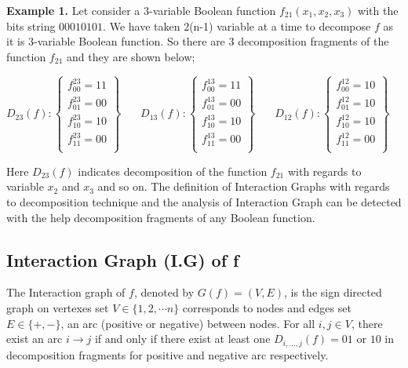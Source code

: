 \documentclass{article}
\begin{document}
 \textbf{Example 1.} Let consider a $3$-variable Boolean function $f_{21}(x_{1},x_{2},x_{3})$ with the bits string $00010101$. We have taken 2(n-1) variable at a time to decompose $f$ as it is 3-variable Boolean function. So there are $3$ decomposition fragments of the function  $f_{21}$ and they are shown below; 
 \begin{center}
   \resizebox{10cm}{!}
   {
   \centering
     $D_{23}(f) :\left \lbrace \begin{array}{c}
     
          f_{00}^{23}=11\\
          f_{01}^{23}=00\\
          f_{10}^{23}=10\\
          f_{11}^{23}=00\\
                           			
     \end{array} \right\rbrace$ $\:\:\:\:\:$
     $D_{13}(f) :\left \lbrace \begin{array}{c}
       
          f_{00}^{13}=11\\
          f_{01}^{13}=00\\
          f_{10}^{13}=10\\
          f_{11}^{13}=00\\
                             			
     \end{array} \right\rbrace$ $\:\:\:\:\:$
     $D_{12}(f) :\left \lbrace \begin{array}{c}
         
          f_{00}^{12}=10\\
          f_{01}^{12}=10\\
          f_{10}^{12}=10\\
          f_{11}^{12}=00\\
                               			
      \end{array} \right\rbrace$ 
 }
 \end{center}     
 Here $D_{23}(f)$ indicates decomposition of the function $f_{21}$ with regards to variable $x_{2}$ and $x_{3}$ and so on. The definition of Interaction Graphs with regards to decomposition technique and the analysis of Interaction Graph can be detected with the help decomposition fragments of any Boolean function.
   
 \subsection{Interaction Graph (I.G) of f}
 \noindent
 The Interaction graph of $f$, denoted by $G(f)=(V,E)$, is the sign directed graph on vertexes set $V\in \{1,2,\cdots n\}$ corresponds to nodes and edges set $ E \in \{+,-\}$, an arc (positive or negative) between nodes. For all $i, j \in V$, there exist an arc $i \longrightarrow j$ if and only if there exist at least one $D_{i,\ldots,j}(f)=01$ or $10$ in decomposition fragments for positive and negative arc respectively.
 
\end{document}
